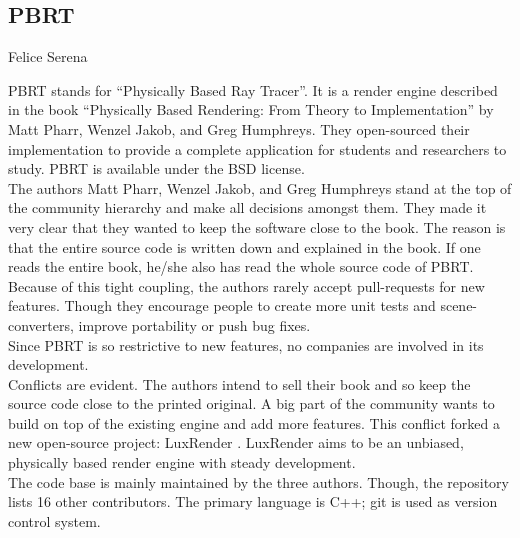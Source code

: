 \subsection{PBRT}{Felice Serena}

PBRT stands for ``Physically Based Ray Tracer''. 
It is a render engine described in the book ``Physically Based Rendering: 
From Theory to Implementation'' by Matt Pharr, Wenzel Jakob, and Greg Humphreys. 
They open-sourced their implementation to provide a complete application for students and researchers to study. 
PBRT is available under the BSD license. 
\\

The authors Matt Pharr, Wenzel Jakob, and Greg Humphreys stand at the top of the community hierarchy and make all decisions amongst them. 
They made it very clear that they wanted to keep the software close to the book. 
The reason is that the entire source code is written down and explained in the book. 
If one reads the entire book, he/she also has read the whole source code of PBRT.
Because of this tight coupling, the authors rarely accept pull-requests for new features. 
Though they encourage people to create more unit tests and scene-converters, improve portability or push bug fixes. \cite{pbrt-pull-requests} \\

Since PBRT is so restrictive to new features, no companies are involved in its development. \\

Conflicts are evident. 
The authors intend to sell their book and so keep the source code close to the printed original. 
A big part of the community wants to build on top of the existing engine and add more features. 
This conflict forked a new open-source project: LuxRender \cite{luxrender-home}.
LuxRender aims to be an unbiased, physically based render engine with steady development.
\\

The code base is mainly maintained by the three authors.
Though, the repository lists 16 other contributors.
The primary language is C++; git is used as version control system.

